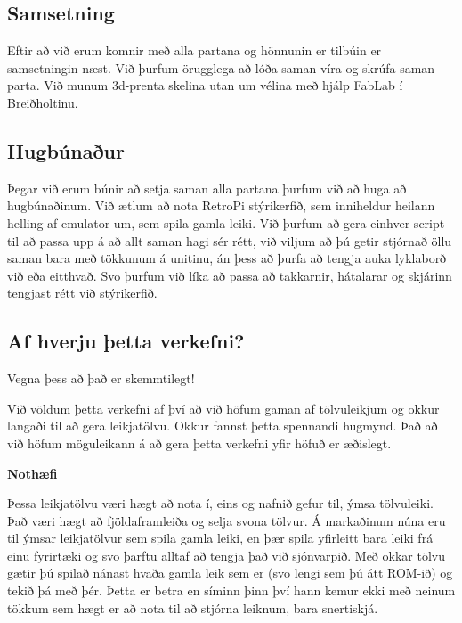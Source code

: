 \subsection{Samsetning}

Eftir að við erum komnir með alla partana og hönnunin er tilbúin er samsetningin næst. Við þurfum örugglega að lóða saman víra og skrúfa saman parta. Við munum 3d-prenta skelina utan um vélina með hjálp FabLab í Breiðholtinu.

\subsection{Hugbúnaður}

Þegar við erum búnir að setja saman alla partana þurfum við að huga að hugbúnaðinum. Við ætlum að nota RetroPi stýrikerfið, sem inniheldur heilann helling af emulator-um, sem spila gamla leiki. Við þurfum að gera einhver script til að passa upp á að allt saman hagi sér rétt, við viljum að þú getir stjórnað öllu saman bara með tökkunum á unitinu, án þess að þurfa að tengja auka lyklaborð við eða eitthvað. Svo þurfum við líka að passa að takkarnir, hátalarar og skjárinn tengjast rétt við stýrikerfið.

\subsection{Af hverju þetta verkefni?}

Vegna þess að það er skemmtilegt!

Við völdum þetta verkefni af því að við höfum gaman af tölvuleikjum og okkur langaði til að gera leikjatölvu. Okkur fannst þetta spennandi hugmynd. Það að við höfum möguleikann á að gera þetta verkefni yfir höfuð er æðislegt.

\textbf{Nothæfi}

Þessa leikjatölvu væri hægt að nota í, eins og nafnið gefur til, ýmsa tölvuleiki. Það væri hægt að fjöldaframleiða og selja svona tölvur. Á markaðinum núna eru til ýmsar leikjatölvur sem spila gamla leiki, en þær spila yfirleitt bara leiki frá einu fyrirtæki og svo þarftu alltaf að tengja það við sjónvarpið. Með okkar tölvu gætir þú spilað nánast hvaða gamla leik sem er (svo lengi sem þú átt ROM-ið) og tekið þá með þér. Þetta er betra en síminn þinn því hann kemur ekki með neinum tökkum sem hægt er að nota til að stjórna leiknum, bara snertiskjá.